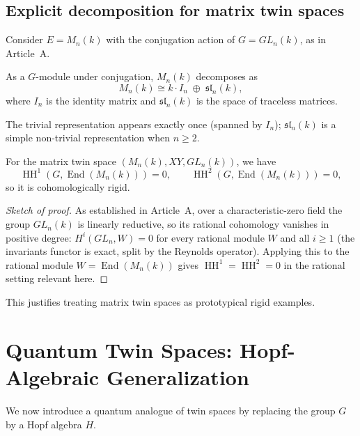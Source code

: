 \documentclass[11pt,a4paper]{article}
\numberwithin{equation}{section}
\DeclareMathOperator{\End}{End}
\DeclareMathOperator{\HH}{HH}
\begin{document}
	\subsection{Explicit decomposition for matrix twin spaces}
	
	Consider $E=M_n(k)$ with the conjugation action of $G=GL_n(k)$, as in Article~A.
	
	\begin{proposition}
		As a $G$-module under conjugation, $M_n(k)$ decomposes as
		\[
		M_n(k) \cong k\cdot I_n \;\oplus\; \mathfrak{sl}_n(k),
		\]
		where $I_n$ is the identity matrix and $\mathfrak{sl}_n(k)$ is the space of traceless matrices.
	\end{proposition}
	
	\begin{remark}
		The trivial representation appears exactly once (spanned by $I_n$); $\mathfrak{sl}_n(k)$ is a
		simple non-trivial representation when $n\ge 2$.
	\end{remark}
	
	\begin{theorem}
		\label{thm:matrix-cohom-C}
		For the matrix twin space $(M_n(k),XY,GL_n(k))$, we have
		\[
		\HH^1(G,\End(M_n(k)))=0,\qquad \HH^2(G,\End(M_n(k)))=0,
		\]
		so it is cohomologically rigid.
	\end{theorem}
	
	\begin{proof}[Sketch of proof]
		As established in Article~A, over a characteristic-zero field the group $GL_n(k)$ is linearly reductive, so its
		rational cohomology vanishes in positive degree: $H^i(GL_n,W)=0$ for every rational module $W$ and all $i\ge1$ 
		(the invariants functor is exact, split by the Reynolds operator). Applying this to the rational module
		$W=\End(M_n(k))$ gives $\HH^1=\HH^2=0$ in the rational setting relevant here.
	\end{proof}
	
	This justifies treating matrix twin spaces as prototypical rigid examples.
	
	\section{Quantum Twin Spaces: Hopf-Algebraic Generalization}
	\label{sec:quantum-twin}
	
	We now introduce a quantum analogue of twin spaces by replacing the group $G$ by a Hopf algebra $H$.
	
\end{document}
